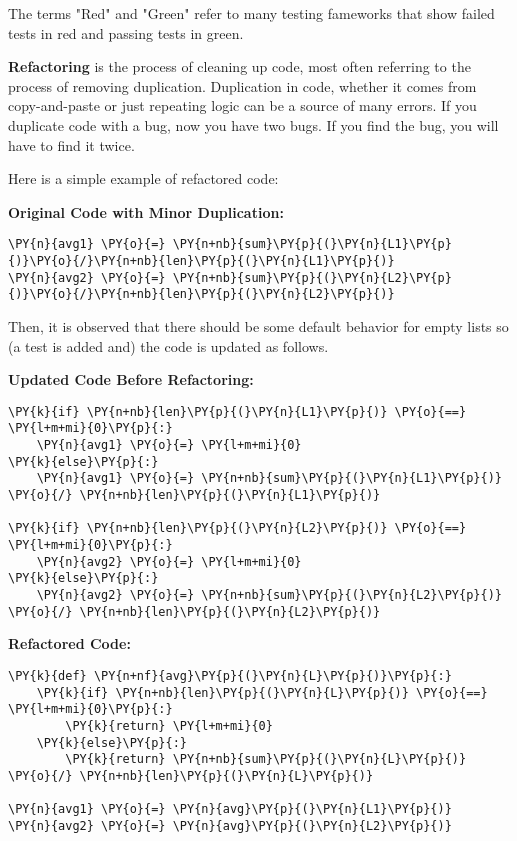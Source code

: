 The terms "Red" and "Green" refer to many testing fameworks that show failed tests in red and passing tests in green.


\textbf{Refactoring} is the process of cleaning up code, most often referring to the process of removing duplication.  Duplication in code, whether it comes from copy-and-paste or just repeating logic can be a source of many errors.  If you duplicate code with a bug, now you have two bugs.  If you find the bug, you will have to find it twice.


Here is a simple example of refactored code:


\textbf{Original Code with Minor Duplication:}

\begin{Verbatim}[commandchars=\\\{\}]
\PY{n}{avg1} \PY{o}{=} \PY{n+nb}{sum}\PY{p}{(}\PY{n}{L1}\PY{p}{)}\PY{o}{/}\PY{n+nb}{len}\PY{p}{(}\PY{n}{L1}\PY{p}{)}
\PY{n}{avg2} \PY{o}{=} \PY{n+nb}{sum}\PY{p}{(}\PY{n}{L2}\PY{p}{)}\PY{o}{/}\PY{n+nb}{len}\PY{p}{(}\PY{n}{L2}\PY{p}{)}
\end{Verbatim}



Then, it is observed that there should be some default behavior for empty lists so (a test is added and) the code is updated as follows.


\textbf{Updated Code Before Refactoring:}

\begin{Verbatim}[commandchars=\\\{\}]
\PY{k}{if} \PY{n+nb}{len}\PY{p}{(}\PY{n}{L1}\PY{p}{)} \PY{o}{==} \PY{l+m+mi}{0}\PY{p}{:}
    \PY{n}{avg1} \PY{o}{=} \PY{l+m+mi}{0}
\PY{k}{else}\PY{p}{:}
    \PY{n}{avg1} \PY{o}{=} \PY{n+nb}{sum}\PY{p}{(}\PY{n}{L1}\PY{p}{)} \PY{o}{/} \PY{n+nb}{len}\PY{p}{(}\PY{n}{L1}\PY{p}{)}

\PY{k}{if} \PY{n+nb}{len}\PY{p}{(}\PY{n}{L2}\PY{p}{)} \PY{o}{==} \PY{l+m+mi}{0}\PY{p}{:}
    \PY{n}{avg2} \PY{o}{=} \PY{l+m+mi}{0}
\PY{k}{else}\PY{p}{:}
    \PY{n}{avg2} \PY{o}{=} \PY{n+nb}{sum}\PY{p}{(}\PY{n}{L2}\PY{p}{)} \PY{o}{/} \PY{n+nb}{len}\PY{p}{(}\PY{n}{L2}\PY{p}{)}
\end{Verbatim}



\textbf{Refactored Code:}

\begin{Verbatim}[commandchars=\\\{\}]
\PY{k}{def} \PY{n+nf}{avg}\PY{p}{(}\PY{n}{L}\PY{p}{)}\PY{p}{:}
    \PY{k}{if} \PY{n+nb}{len}\PY{p}{(}\PY{n}{L}\PY{p}{)} \PY{o}{==} \PY{l+m+mi}{0}\PY{p}{:}
        \PY{k}{return} \PY{l+m+mi}{0}
    \PY{k}{else}\PY{p}{:}
        \PY{k}{return} \PY{n+nb}{sum}\PY{p}{(}\PY{n}{L}\PY{p}{)} \PY{o}{/} \PY{n+nb}{len}\PY{p}{(}\PY{n}{L}\PY{p}{)}

\PY{n}{avg1} \PY{o}{=} \PY{n}{avg}\PY{p}{(}\PY{n}{L1}\PY{p}{)}
\PY{n}{avg2} \PY{o}{=} \PY{n}{avg}\PY{p}{(}\PY{n}{L2}\PY{p}{)}
\end{Verbatim}



